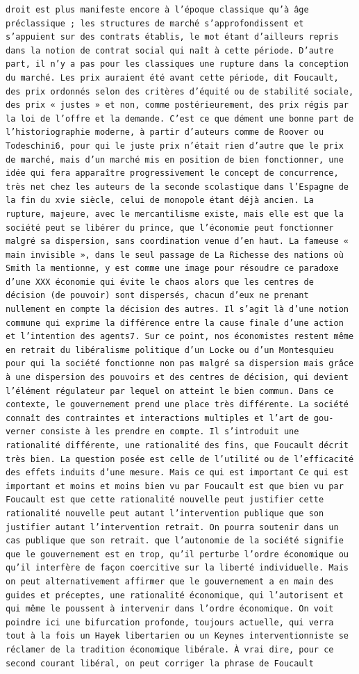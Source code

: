 \documentclass[
]{book}
\begin{document}
\begin{verbatim}
droit est plus manifeste encore à l’époque classique qu’à âge préclassique ; les structures de marché s’approfondissent et s’appuient sur des contrats établis, le mot étant d’ailleurs repris dans la notion de contrat social qui naît à cette période. D’autre part, il n’y a pas pour les classiques une rupture dans la conception du marché. Les prix auraient été avant cette période, dit Foucault, des prix ordonnés selon des critères d’équité ou de stabilité sociale, des prix « justes » et non, comme postérieurement, des prix régis par la loi de l’offre et la demande. C’est ce que dément une bonne part de l’historiographie moderne, à partir d’auteurs comme de Roover ou Todeschini6, pour qui le juste prix n’était rien d’autre que le prix de marché, mais d’un marché mis en position de bien fonctionner, une idée qui fera apparaître progressivement le concept de concurrence, très net chez les auteurs de la seconde scolastique dans l’Espagne de la fin du xvie siècle, celui de monopole étant déjà ancien. La rupture, majeure, avec le mercantilisme existe, mais elle est que la société peut se libérer du prince, que l’économie peut fonctionner malgré sa dispersion, sans coordination venue d’en haut. La fameuse « main invisible », dans le seul passage de La Richesse des nations où Smith la mentionne, y est comme une image pour résoudre ce paradoxe d’une XXX économie qui évite le chaos alors que les centres de décision (de pouvoir) sont dispersés, chacun d’eux ne prenant nullement en compte la décision des autres. Il s’agit là d’une notion commune qui exprime la différence entre la cause finale d’une action et l’intention des agents7. Sur ce point, nos économistes restent même en retrait du libéralisme politique d’un Locke ou d’un Montesquieu pour qui la société fonctionne non pas malgré sa dispersion mais grâce à une dispersion des pouvoirs et des centres de décision, qui devient l’élément régulateur par lequel on atteint le bien commun. Dans ce contexte, le gouvernement prend une place très différente. La société connaît des contraintes et interactions multiples et l’art de gou- verner consiste à les prendre en compte. Il s’introduit une rationalité différente, une rationalité des fins, que Foucault décrit très bien. La question posée est celle de l’utilité ou de l’efficacité des effets induits d’une mesure. Mais ce qui est important Ce qui est important et moins et moins bien vu par Foucault est que bien vu par Foucault est que cette rationalité nouvelle peut justifier cette rationalité nouvelle peut autant l’intervention publique que son justifier autant l’intervention retrait. On pourra soutenir dans un cas publique que son retrait. que l’autonomie de la société signifie que le gouvernement est en trop, qu’il perturbe l’ordre économique ou qu’il interfère de façon coercitive sur la liberté individuelle. Mais on peut alternativement affirmer que le gouvernement a en main des guides et préceptes, une rationalité économique, qui l’autorisent et qui même le poussent à intervenir dans l’ordre économique. On voit poindre ici une bifurcation profonde, toujours actuelle, qui verra tout à la fois un Hayek libertarien ou un Keynes interventionniste se réclamer de la tradition économique libérale. À vrai dire, pour ce second courant libéral, on peut corriger la phrase de Foucault 
\end{verbatim}
\end{document}
